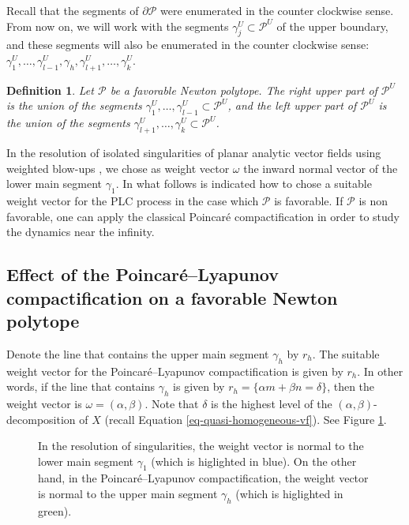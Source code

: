 \documentclass[12pt]{amsart}
\newtheorem{definition}[theorem]{Definition}
\begin{document}
Recall that the segments of $\partial\mathcal{P}$ were enumerated in the counter clockwise sense. From now on, we will work with the segments $\gamma^{U}_{j}\subset\mathcal{P}^{U}$ of the upper boundary, and these segments will also be enumerated in the counter clockwise sense: $\gamma^{U}_{1},\dots,\gamma^{U}_{l-1},\gamma_{h},\gamma^{U}_{l+1},\dots,\gamma^{U}_{k}$.

\begin{definition}
Let $\mathcal{P}$ be a favorable Newton polytope. The \emph{right upper part of $\mathcal{P}^{U}$} is the union of the segments $\gamma^{U}_{1},\dots,\gamma^{U}_{l-1}\subset\mathcal{P}^{U}$, and the \emph{left upper part of $\mathcal{P}^{U}$} is the union of the segments $\gamma^{U}_{l+1},\dots,\gamma^{U}_{k}\subset\mathcal{P}^{U}$.
\end{definition}

In the resolution of isolated singularities of planar analytic vector fields using weighted blow-ups \cite{Pelletier}, we chose as weight vector $\omega$ the inward normal vector of the lower main segment $\gamma_{1}$. In what follows is indicated how to chose a suitable weight vector for the PLC process in the case which $\mathcal{P}$ is favorable. If $\mathcal{P}$ is non favorable, one can apply the classical Poincaré compactification in order to study the dynamics near the infinity. 


\subsection{Effect of the Poincaré--Lyapunov compactification on a favorable Newton polytope}

Denote the line that contains the upper main segment $\gamma_{h}$ by $r_{h}$. The suitable weight vector for the Poincaré--Lyapunov compactification is given by $r_{h}$. In other words, if the line that contains $\gamma_{h}$ is given by $r_{h} = \{\alpha m + \beta n = \delta\}$, then the weight vector is $\omega = (\alpha,\beta)$. Note that $\delta$ is the highest level of the $(\alpha,\beta)$-decomposition of $X$ (recall Equation \eqref{eq-quasi-homogeneous-vf}). See Figure \ref{fig-segments}.

\begin{figure}[h]
\caption{\footnotesize{In the resolution of singularities, the weight vector is normal to the lower main segment $\gamma_{1}$ (which is higlighted in blue). On the other hand, in the Poincaré--Lyapunov compactification, the weight vector is normal to the upper main segment $\gamma_{h}$ (which is higlighted in green).}}
\label{fig-segments}
\end{figure}
\end{document}
